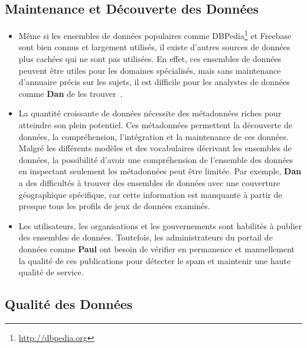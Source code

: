 \subsection{Maintenance et D\'{e}couverte des Donn\'{e}es}

\begin{itemize}
\item M\^{e}me si les ensembles de donn\'{e}es populaires comme DBPedia\footnote{\url{http://dbpedia.org}} et Freebase sont bien connus et largement utilis\'{e}s, il existe d'autres sources de donn\'{e}es plus cach\'{e}es qui ne sont pas utilis\'{e}es. En effet, ces ensembles de donn\'{e}es peuvent \^{e}tre utiles pour les domaines sp\'{e}cialis\'{e}s, mais sans maintenance d'annuaire pr\'{e}cis sur les sujets, il est difficile pour les analystes de donn\'{e}es comme \textbf{Dan} de les trouver~\cite{Lalithsena:WI:13}.
\item La quantit\'{e} croissante de donn\'{e}es n\'{e}cessite des m\'{e}tadonn\'{e}es riches pour atteindre son plein potentiel. Ces m\'{e}tadonn\'{e}es permettent la d\'{e}couverte de donn\'{e}es, la compr\'{e}hension, l'int\'{e}gration et la maintenance de ces donn\'{e}es. Malgr\'{e} les diff\'{e}rents mod\`{e}les et des vocabulaires d\'{e}crivant les ensembles de donn\'{e}es, la possibilit\'{e} d'avoir une compr\'{e}hension de l'ensemble des donn\'{e}es en inspectant seulement les m\'{e}tadonn\'{e}es peut \^{e}tre limit\'{e}e. Par exemple, \textbf{Dan} a des difficult\'{e}s \`{a} trouver des ensembles de donn\'{e}es avec une couverture g\'{e}ographique sp\'{e}cifique, car cette information est manquante \`{a} partir de presque tous les profils de jeux de donn\'{e}es examin\'{e}s.
\item Les utilisateurs, les organisations et les gouvernements sont habilit\'{e}s \`{a} publier des ensembles de donn\'{e}es. Toutefois, les administrateurs du portail de donn\'{e}es comme \textbf{Paul} ont besoin de v\'{e}rifier en permanence et manuellement la qualit\'{e} de ces publications pour d\'{e}tecter le spam et maintenir une haute qualit\'{e} de service.
\end{itemize}

\subsection{Qualit\'{e} des Donn\'{e}es}


